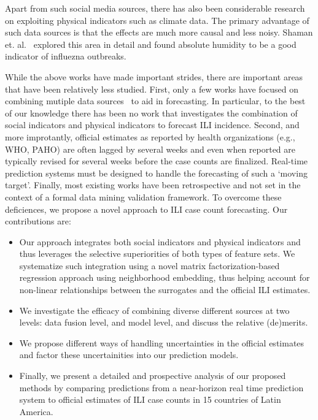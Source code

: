 Apart from such social media sources,
there has also been considerable research on 
exploiting physical indicators such as climate data.
The primary advantage of such data sources is that the
effects are much more causal and less noisy. 
Shaman et. al.~\cite{ref9, Shaman_orig_humidity_link, Shaman_humidity_USA} 
explored this area in detail and found absolute humidity 
to be a good indicator of influezna outbreaks.

While the above works have made important strides, there are important areas that
have been relatively less studied. First, 
only a few works have focused on combining mutiple data sources~\cite{ref10, ref3}
to aid in forecasting. In particular, to the best of our knowledge there has been no work
that investigates the combination of social indicators and physical indicators to forecast
ILI incidence. Second, and more improtantly, official estimates as reported by health
organizations (e.g., WHO, PAHO) are often lagged by several weeks and
even when reported are typically revised for several weeks before the case counts are
finalized. Real-time prediction systems must be designed to handle the forecasting of
such a `moving target'. Finally, most existing works have been retrospective and not set in
the context of a formal data mining validation framework. To overcome these deficiences, we
propose a novel approach to ILI case count forecasting. Our contributions are:
\vspace{-1em}
\begin{itemize}
  \item Our approach integrates both social indicators and physical indicators and thus
leverages the selective superiorities of both types of feature sets. We systematize such
integration using a novel matrix factorization-based regression approach
using neighborhood embedding, thus helping account for 
non-linear relationships between the surrogates and the official ILI estimates.
  \item We investigate the efficacy of combining diverse different sources at two
levels: data fusion level, and model level, and discuss the relative (de)merits.
  \item We propose different ways of handling uncertainties in the official 
    estimates and factor these uncertainities into our prediction models.
  \item Finally, we present a detailed and prospective analysis of our proposed methods
    by comparing predictions from a near-horizon real time prediction system to 
    official estimates of ILI case counts in 15 countries of Latin America.
\end{itemize}

